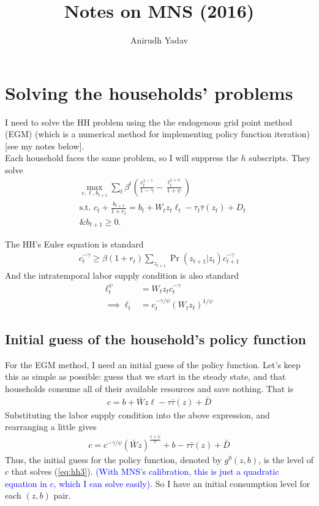 \documentclass[12pt]{article}
\title{Notes on MNS (2016)}
\author{Anirudh Yadav}
\begin{document}
\maketitle


\section{Solving the households' problems}
I need to solve the HH problem using the the endogenous grid point method (EGM) (which is a numerical method for implementing policy function iteration) [see my notes below].\\

Each household faces the same problem, so I will suppress the $h$ subscripts. They solve
\begin{align*}
&\max_{c,\ell, b_{t+1}} \sum_t \beta^t \left(\frac{c_t^{1-\gamma}}{1-\gamma} - \frac{\ell_t^{1+\psi}}{1+\psi}\right)\\
&\text{s.t. } c_t + \frac{b_{t+1}}{1+r_t} = b_t + W_tz_t\ell_t - \tau_t\bar\tau(z_t) +D_t\\
&\text{\& } b_{t+1} \geq 0.
\end{align*}

The HH's Euler equation is standard
\begin{align}
c_t^{-\gamma} \geq \beta(1+r_t) \sum_{z_{t+1}}\Pr(z_{t+1}|z_t)c_{t+1}^{-\gamma}  \label{eq:hh1}
\end{align}
And the intratemporal labor supply condition is also standard
\begin{align}
\ell_t^\psi &= W_tz_tc_t^{-\gamma} \label{eq:hh2}\\
\implies  \ell_t&=c_t^{-\gamma/\psi}(W_tz_t)^{1/\psi}
\end{align}

\subsection{Initial guess of the household's policy function}
For the EGM method, I need an initial guess of the policy function. Let's keep this as simple as possible: guess that we start in the steady state, and that households consume all of their available resources and save nothing. That is
\begin{align*}
c =  b + \bar Wz\ell - \tau\bar\tau(z) +\bar D
\end{align*}
Substituting the labor supply condition into the above expression, and rearranging a little gives
\begin{align}
c = c^{-\gamma/\psi}(\bar Wz)^{\frac{1+\psi}{\psi}}+ b - \tau\bar\tau(z) +\bar D \label{eq:hh3}
\end{align}
Thus, the initial guess for the policy function, denoted by $g^0(z,b)$, is the level of $c$ that solves (\ref{eq:hh3}). \textcolor{blue}{(With MNS's calibration, this is just a quadratic equation in $c$, which I can solve easily).} So I have an initial consumption level for each $(z,b)$ pair.
\end{document}
